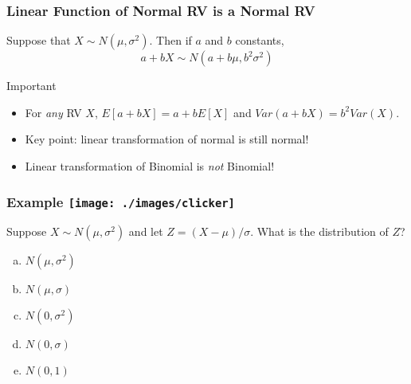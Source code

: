 

\begin{frame}
\frametitle{Linear Function of Normal RV is a Normal RV}


Suppose that $X \sim N(\mu, \sigma^2)$. Then if $a$ and $b$ constants,
$$\boxed{a + bX \sim N(a + b\mu, b^2 \sigma^2)}$$

\begin{block}{Important}
	\begin{itemize}
    \item  For \emph{any} RV $X$, $E[a + bX] = a +bE[X]$ and $Var(a +bX) = b^2 Var(X)$.
		\item Key point: linear transformation of normal is still normal!
    \item Linear transformation of Binomial is \emph{not} Binomial!
	\end{itemize}
\end{block}

\end{frame}

\begin{frame}
\frametitle{Example \hfill \texttt{[image: ./images/clicker]}}
Suppose $X \sim N(\mu, \sigma^2)$ and let $Z = (X -\mu)/\sigma$. What is the distribution of $Z$?

\begin{enumerate}[(a)]
	\item $N(\mu, \sigma^2)$
	\item $N(\mu, \sigma)$
	\item $N(0, \sigma^2)$
	\item  $N(0, \sigma)$
	\item $N(0,1)$
\end{enumerate}
\end{frame}

